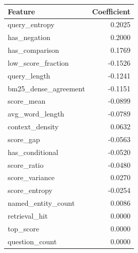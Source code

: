 \begin{tabular}{lr}
\toprule
Feature & Coefficient \\
\midrule
query_entropy & 0.2025 \\
has_negation & 0.2000 \\
has_comparison & 0.1769 \\
low_score_fraction & -0.1526 \\
query_length & -0.1241 \\
bm25_dense_agreement & -0.1151 \\
score_mean & -0.0899 \\
avg_word_length & -0.0789 \\
context_density & 0.0632 \\
score_gap & -0.0563 \\
has_conditional & -0.0520 \\
score_ratio & -0.0480 \\
score_variance & 0.0270 \\
score_entropy & -0.0254 \\
named_entity_count & 0.0086 \\
retrieval_hit & 0.0000 \\
top_score & 0.0000 \\
question_count & 0.0000 \\
\bottomrule
\end{tabular}
